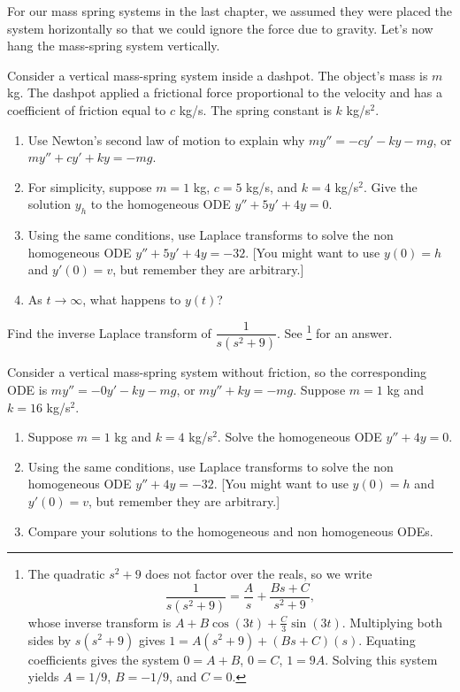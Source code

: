 For our mass spring systems in the last chapter, we assumed they were placed the system horizontally so that we could ignore the force due to gravity.  Let's now hang the mass-spring system vertically. 

\begin{problem}
 Consider a vertical mass-spring system inside a dashpot. The object's mass is $m$ kg. The dashpot applied a frictional force proportional to the velocity and has a coefficient of friction equal to $c$ kg/s. The spring constant is $k$ kg/s$^2$.  
\begin{enumerate}
 \item Use Newton's second law of motion to explain why $my''=-cy'-ky-mg$, or $my''+cy'+ky=-mg$.
 \item For simplicity, suppose $m=1$ kg, $c=5$ kg/s, and $k=4$ kg/s$^2$. Give the solution $y_h$ to the homogeneous ODE $y''+5y'+4y=0$.
 \item{}%
Using the same conditions, use Laplace transforms to solve the non homogeneous ODE $y''+5y'+4y=-32$. [You might want to use $y(0)=h$ and $y'(0)=v$, but remember they are arbitrary.]
 \item As $t\to \infty$, what happens to $y(t)$?
\end{enumerate}
\end{problem}

\begin{review*}
Find the inverse Laplace transform of $\dfrac{1}{s(s^2+9)}$. See \footnote{
The quadratic $s^2+9$ does not factor over the reals, so we write
$$\dfrac{1}{s(s^2+9)} = \frac{A}{s}+\frac{Bs+C}{s^2+9},$$
whose inverse transform is $A+B\cos(3t)+\frac{C}{3}\sin(3t)$. 
Multiplying both sides by $s(s^2+9)$ gives $1=A(s^2+9)+(Bs+C)(s)$.  Equating coefficients gives the system $0=A+B$, $0=C$, $1=9A$. Solving this system yields $A=1/9$, $B=-1/9$, and $C=0$.
} for an answer.
\end{review*}


\begin{problem}
 Consider a vertical mass-spring system without friction, so the corresponding ODE is $my''=-0y'-ky-mg$, or $my''+ky=-mg$.  Suppose $m=1$ kg and $k=16$ kg/s$^2$.
\begin{enumerate}
 \item Suppose $m=1$ kg and $k=4$ kg/s$^2$. Solve the homogeneous ODE $y''+4y=0$.
 \item{}%
Using the same conditions, use Laplace transforms to solve the non homogeneous ODE $y''+4y=-32$. [You might want to use $y(0)=h$ and $y'(0)=v$, but remember they are arbitrary.]
 \item Compare your solutions to the homogeneous and non homogeneous ODEs.
\end{enumerate} 
\end{problem}


